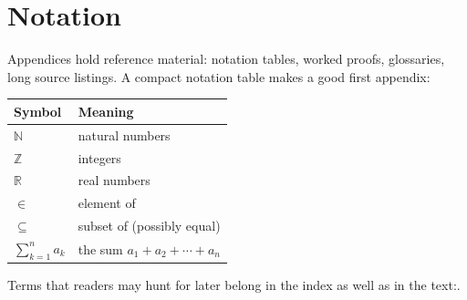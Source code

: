 %
\chapter{Notation}\label{app:notation}

Appendices hold reference material: notation tables, worked proofs,
glossaries, long source listings. A compact notation table makes a
good first appendix:

\begin{center}
  \begin{tabular}{ll}
    \toprule
    Symbol & Meaning\\
    \midrule
    $\mathbb{N}$   & natural numbers\\
    $\mathbb{Z}$   & integers\\
    $\mathbb{R}$   & real numbers\\
    $\in$          & element of\\
    $\subseteq$    & subset of (possibly equal)\\
    $\sum_{k=1}^{n} a_k$ & the sum $a_1 + a_2 + \cdots + a_n$\\
    \bottomrule
  \end{tabular}
\end{center}

\noindent
Terms that readers may hunt for later belong in the index as well as
in the text:.

